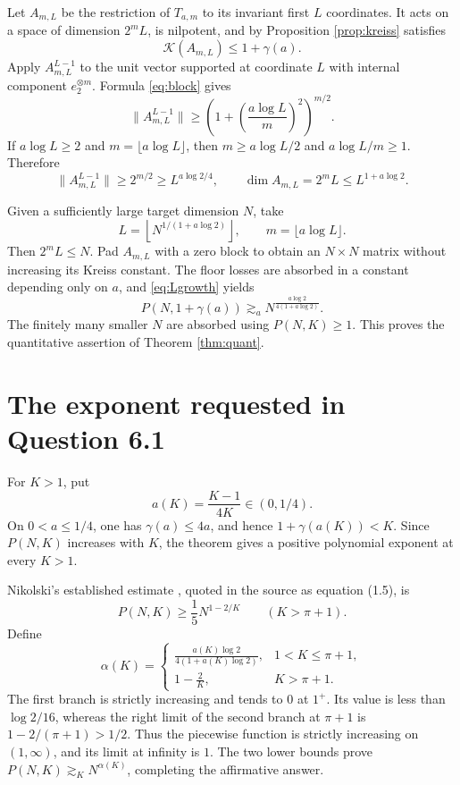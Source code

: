 \documentclass[10pt]{article}
\newcommand{\Kreiss}{\mathcal K}
\begin{document}
Let $A_{m,L}$ be the restriction of $T_{a,m}$ to its invariant first $L$
coordinates.  It acts on a space of dimension $2^mL$, is nilpotent, and by
Proposition \ref{prop:kreiss} satisfies
\[
 \Kreiss(A_{m,L})\le1+\gamma(a).
\]
Apply $A_{m,L}^{L-1}$ to the unit vector supported at coordinate $L$ with
internal component $e_2^{\otimes m}$.  Formula \eqref{eq:block} gives
\begin{equation}\label{eq:power}
 \|A_{m,L}^{L-1}\|
 \ge\left(1+\left(\frac{a\log L}{m}\right)^2\right)^{m/2}.
\end{equation}
If $a\log L\ge2$ and $m=\lfloor a\log L\rfloor$, then
$m\ge a\log L/2$ and $a\log L/m\ge1$.  Therefore
\begin{equation}\label{eq:Lgrowth}
 \|A_{m,L}^{L-1}\|\ge2^{m/2}\ge L^{a\log2/4},
 \qquad
 \dim A_{m,L}=2^mL\le L^{1+a\log2}.
\end{equation}

Given a sufficiently large target dimension $N$, take
\[
 L=\left\lfloor N^{1/(1+a\log2)}\right\rfloor,
 \qquad m=\lfloor a\log L\rfloor.
\]
Then $2^mL\le N$.  Pad $A_{m,L}$ with a zero block to obtain an $N\times N$
matrix without increasing its Kreiss constant.  The floor losses are absorbed
in a constant depending only on $a$, and \eqref{eq:Lgrowth} yields
\[
 P(N,1+\gamma(a))\gtrsim_a
 N^{\frac{a\log2}{4(1+a\log2)}}.
\]
The finitely many smaller $N$ are absorbed using $P(N,K)\ge1$.  This proves
the quantitative assertion of Theorem \ref{thm:quant}.

\section{The exponent requested in Question 6.1}

For $K>1$, put
\[
 a(K)=\frac{K-1}{4K} \in(0,1/4).
\]
On $0<a\le1/4$, one has $\gamma(a)\le4a$, and hence
$1+\gamma(a(K))<K$.  Since $P(N,K)$ increases with $K$, the theorem gives a
positive polynomial exponent at every $K>1$.

Nikolski's established estimate \cite{Nikolski}, quoted in the source as
equation (1.5), is
\[
 P(N,K)\ge\frac15N^{1-2/K}\qquad(K>\pi+1).
\]
Define
\[
 \alpha(K)=
 \begin{cases}
 \displaystyle\frac{a(K)\log2}{4(1+a(K)\log2)},&1<K\le\pi+1,\\[6pt]
 \displaystyle1-\frac2K,&K>\pi+1.
 \end{cases}
\]
The first branch is strictly increasing and tends to $0$ at $1^+$.  Its
value is less than $\log2/16$, whereas the right limit of the second branch
at $\pi+1$ is $1-2/(\pi+1)>1/2$.  Thus the piecewise function is strictly
increasing on $(1,\infty)$, and its limit at infinity is $1$.  The two lower
bounds prove $P(N,K)\gtrsim_KN^{\alpha(K)}$, completing the affirmative answer.
\end{document}

